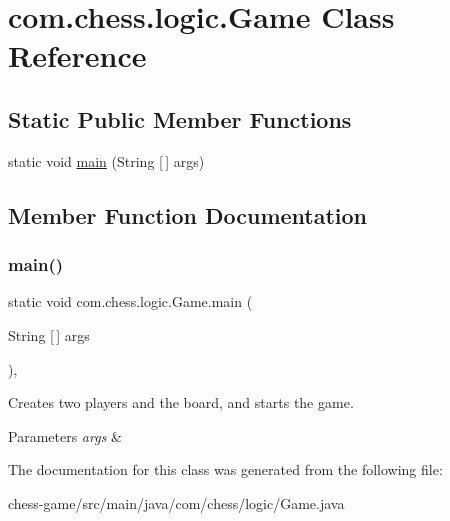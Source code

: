 \hypertarget{classcom_1_1chess_1_1logic_1_1_game}{}\section{com.\+chess.\+logic.\+Game Class Reference}
\label{classcom_1_1chess_1_1logic_1_1_game}
\subsection*{Static Public Member Functions}
\begin{DoxyCompactItemize}
\item 
static void \mbox{\hyperlink{classcom_1_1chess_1_1logic_1_1_game_ae3f96178529f4629fdc4aa0cbaf7c700}{main}} (String \mbox{[}$\,$\mbox{]} args)
\end{DoxyCompactItemize}


\subsection{Member Function Documentation}
\mbox{\label{classcom_1_1chess_1_1logic_1_1_game_ae3f96178529f4629fdc4aa0cbaf7c700}} 
\subsubsection{\texorpdfstring{main()}{main()}}
{\footnotesize\ttfamily static void com.\+chess.\+logic.\+Game.\+main (\begin{DoxyParamCaption}\item[{String \mbox{[}$\,$\mbox{]}}]{args }\end{DoxyParamCaption})\hspace{0.3cm}{\ttfamily [inline]}, {\ttfamily [static]}}

Creates two players and the board, and starts the game. 
\begin{DoxyParams}{Parameters}
{\em args} & \\
\hline
\end{DoxyParams}


The documentation for this class was generated from the following file\+:\begin{DoxyCompactItemize}
\item 
chess-\/game/src/main/java/com/chess/logic/Game.\+java\end{DoxyCompactItemize}
